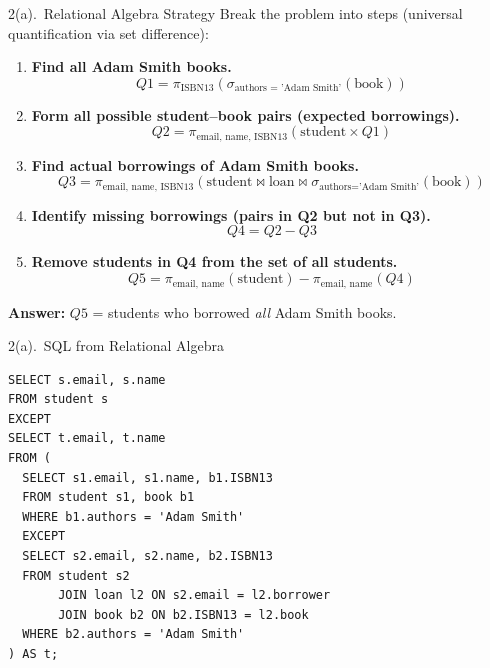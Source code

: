 \documentclass{beamer}
\begin{document}
\begin{frame}{2(a).\ Relational Algebra Strategy}
\small
Break the problem into steps (universal quantification via set difference):

\begin{enumerate}
  \item \textbf{Find all Adam Smith books.}  
    \[
      Q1 = \pi_{\text{ISBN13}}
           (\sigma_{\text{authors = 'Adam Smith'}}(\text{book}))
    \]

  \item \textbf{Form all possible student–book pairs (expected borrowings).}  
    \[
      Q2 = \pi_{\text{email, name, ISBN13}}(\text{student} \times Q1)
    \]

  \item \textbf{Find actual borrowings of Adam Smith books.}  
    \[
      Q3 = \pi_{\text{email, name, ISBN13}}
           (\text{student} \bowtie \text{loan} \bowtie
            \sigma_{\text{authors='Adam Smith'}}(\text{book}))
    \]

  \item \textbf{Identify missing borrowings (pairs in Q2 but not in Q3).}  
    \[
      Q4 = Q2 - Q3
    \]

  \item \textbf{Remove students in Q4 from the set of all students.}  
    \[
      Q5 = \pi_{\text{email, name}}(\text{student}) -
           \pi_{\text{email, name}}(Q4)
    \]
\end{enumerate}

\textbf{Answer:} $Q5$ = students who borrowed \emph{all} Adam Smith books.
\end{frame}

\begin{frame}[fragile]{2(a).\ SQL from Relational Algebra}
\begin{lstlisting}
SELECT s.email, s.name
FROM student s
EXCEPT
SELECT t.email, t.name
FROM (
  SELECT s1.email, s1.name, b1.ISBN13
  FROM student s1, book b1
  WHERE b1.authors = 'Adam Smith'
  EXCEPT
  SELECT s2.email, s2.name, b2.ISBN13
  FROM student s2
       JOIN loan l2 ON s2.email = l2.borrower
       JOIN book b2 ON b2.ISBN13 = l2.book
  WHERE b2.authors = 'Adam Smith'
) AS t;
\end{lstlisting}
\end{frame}

\end{document}
